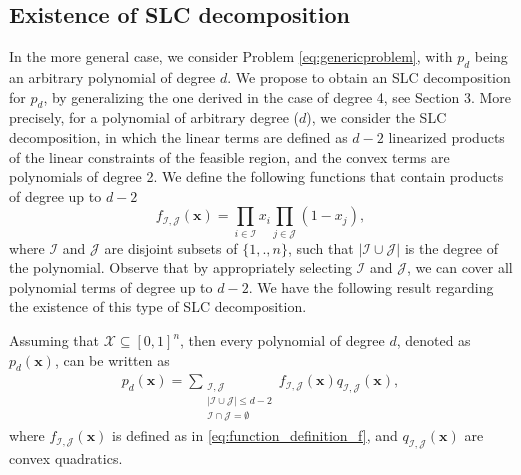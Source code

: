 \documentclass[opre,nonblindrev]{informs3} %
\begin{document}
\subsection{Existence of SLC decomposition}
{\color{black} In the more general case, we consider Problem \eqref{eq:genericproblem}, with $p_d$ being an arbitrary polynomial of degree $d$. We propose to obtain an SLC decomposition for $p_d$, by generalizing the one derived in the case of degree 4, see Section 3. More precisely, for a polynomial of arbitrary degree ($d$), we consider the SLC decomposition, in which the linear terms are defined as $d-2$ linearized products of the linear constraints of the feasible region, and the convex terms are polynomials of degree 2. We define the following functions that contain products of degree up to $d-2$
\begin{equation}
       f_{\mathcal{I},\mathcal{J}}(\boldsymbol{x}) = \prod_{i \in \mathcal{I}} x_i \prod_{j \in \mathcal{J}} (1-x_j), \label{eq:function_definition_f}
\end{equation} 
where $\mathcal{I}$ and $\mathcal{J}$ are disjoint subsets of $\{1,.,n\}$, such that $|\mathcal{I} \cup \mathcal{J}|$ is the degree of the polynomial. Observe that by appropriately selecting $\mathcal{I}$ and $\mathcal{J}$, we can cover all polynomial terms of degree up to $d-2$. We have the following result regarding the existence of this type of SLC decomposition.
\begin{theorem}
\label{thm:exists_degree_arb}
Assuming that $\mathcal{X} \subseteq [0,1]^n$, then every polynomial of degree $d$, denoted as $p_d(\boldsymbol{x})$, can be written as 
\begin{align*}
    p_d(\boldsymbol{x}) = \sum_{\substack{\mathcal{I}, \mathcal{J} \\ |\mathcal{I} \cup \mathcal{J}| \leq d-2 \\ \mathcal{I} \cap \mathcal{J} = \emptyset}} f_{\mathcal{I},\mathcal{J}}(\boldsymbol{x}) q_{\mathcal{I},\mathcal{J}}(\boldsymbol{x}),
\end{align*}   
where $f_{\mathcal{I},\mathcal{J}}(\boldsymbol{x})$ is defined as in \ref{eq:function_definition_f}, and $q_{\mathcal{I},\mathcal{J}}(\boldsymbol{x})$ are convex quadratics. 
\end{theorem} 

}
\end{document}
